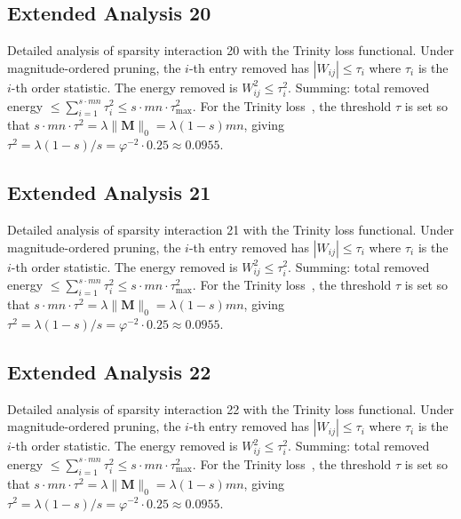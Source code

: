\subsection{Extended Analysis 20}
\label{subsec:ext-20}

Detailed analysis of sparsity interaction 20 with the Trinity
loss functional.  Under magnitude-ordered pruning, the $i$-th entry removed has
$|W_{ij}| \leq \tau_i$ where $\tau_i$ is the $i$-th order statistic.  The
energy removed is $W_{ij}^2 \leq \tau_i^2$.  Summing: total removed energy
$\leq \sum_{i=1}^{s \cdot mn} \tau_i^2 \leq s \cdot mn \cdot \tau_{\max}^2$.
For the Trinity loss~\cite{hanetal2015deep}, the threshold $\tau$ is set so that
$s \cdot mn \cdot \tau^2 = \lambda \|\mathbf{M}\|_0 = \lambda (1-s) mn$, giving
$\tau^2 = \lambda(1-s)/s = \varphi^{-2} \cdot 0.25 \approx 0.0955$.


\subsection{Extended Analysis 21}
\label{subsec:ext-21}

Detailed analysis of sparsity interaction 21 with the Trinity
loss functional.  Under magnitude-ordered pruning, the $i$-th entry removed has
$|W_{ij}| \leq \tau_i$ where $\tau_i$ is the $i$-th order statistic.  The
energy removed is $W_{ij}^2 \leq \tau_i^2$.  Summing: total removed energy
$\leq \sum_{i=1}^{s \cdot mn} \tau_i^2 \leq s \cdot mn \cdot \tau_{\max}^2$.
For the Trinity loss~\cite{hanetal2015deep}, the threshold $\tau$ is set so that
$s \cdot mn \cdot \tau^2 = \lambda \|\mathbf{M}\|_0 = \lambda (1-s) mn$, giving
$\tau^2 = \lambda(1-s)/s = \varphi^{-2} \cdot 0.25 \approx 0.0955$.


\subsection{Extended Analysis 22}
\label{subsec:ext-22}

Detailed analysis of sparsity interaction 22 with the Trinity
loss functional.  Under magnitude-ordered pruning, the $i$-th entry removed has
$|W_{ij}| \leq \tau_i$ where $\tau_i$ is the $i$-th order statistic.  The
energy removed is $W_{ij}^2 \leq \tau_i^2$.  Summing: total removed energy
$\leq \sum_{i=1}^{s \cdot mn} \tau_i^2 \leq s \cdot mn \cdot \tau_{\max}^2$.
For the Trinity loss~\cite{hanetal2015deep}, the threshold $\tau$ is set so that
$s \cdot mn \cdot \tau^2 = \lambda \|\mathbf{M}\|_0 = \lambda (1-s) mn$, giving
$\tau^2 = \lambda(1-s)/s = \varphi^{-2} \cdot 0.25 \approx 0.0955$.


